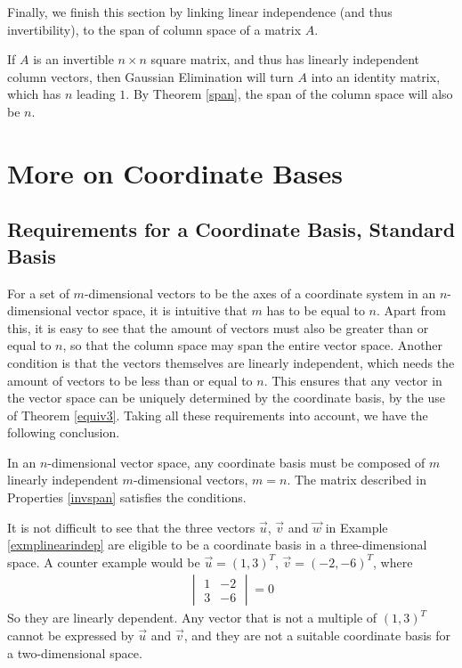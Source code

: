 Finally, we finish this section by linking linear independence (and thus invertibility), to the span of column space of a matrix $A$.
\begin{proper}
\label{invspan}
If $A$ is an invertible $n \times n$ square matrix, and thus has linearly independent column vectors, then Gaussian Elimination will turn $A$ into an identity matrix, which has $n$ leading $1$. By Theorem \ref{span}, the span of the column space will also be $n$.
\end{proper}

\section{More on Coordinate Bases}

\subsection*{Requirements for a Coordinate Basis, Standard Basis}
For a set of $m$-dimensional vectors to be the axes of a coordinate system in an $n$-dimensional vector space, it is intuitive that $m$ has to be equal to $n$. Apart from this, it is easy to see that the amount of vectors must also be greater than or equal to $n$, so that the column space may span the entire vector space. Another condition is that the vectors themselves are linearly independent, which needs the amount of vectors to be less than or equal to $n$. This ensures that any vector in the vector space can be uniquely determined by the coordinate basis, by the use of Theorem \ref{equiv3}. Taking all these requirements into account, we have the following conclusion.
\begin{proper}
In an $n$-dimensional vector space, any coordinate basis must be composed of $m$ linearly independent $m$-dimensional vectors, $m = n$. The matrix described in Properties \ref{invspan} satisfies the conditions.
\end{proper}
It is not difficult to see that the three vectors $\vec{u}$, $\vec{v}$ and $\vec{w}$ in Example \ref{exmplinearindep} are eligible to be a coordinate basis in a three-dimensional space.
A counter example would be $\vec{u} = (1,3)^T$, $\vec{v} = (-2,-6)^T$, where
\begin{align*}
\begin{vmatrix}
1 & -2 \\
3 & -6
\end{vmatrix}
= 0
\end{align*}
So they are linearly dependent. Any vector that is not a multiple of $(1,3)^T$ cannot be expressed by $\vec{u}$ and $\vec{v}$, and they are not a suitable coordinate basis for a two-dimensional space.
